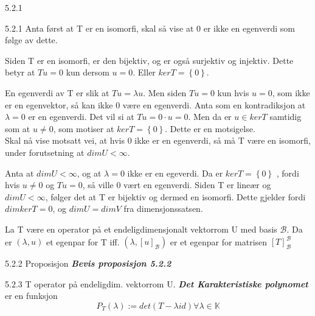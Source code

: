 \documentclass[a4paper,norsk]{article}
\begin{document}
\begin{oppgavebox}{5.2.1}{}

\begin{proofbox}{5.2.1}{}
Anta først at T er en isomorfi, skal så vise at 0 er ikke en egenverdi som følge av dette.

Siden T er en isomorfi, er den bijektiv, og er også surjektiv og injektiv. Dette betyr at $ Tu = 0 $ kun dersom $ u=0$. Eller $ ker T = \left\{ 0 \right\}  $.

En egenverdi av T er slik at $ Tu = \lambda u $. Men siden $ Tu = 0 $ kun hvis $ u=0 $, som ikke er en egenvektor, så kan ikke 0 være en egenverdi. Anta som en kontradiksjon at $ \lambda = 0 $ er en egenverdi. Det vil si at $ Tu = 0  \cdot u=0$. Men da er $ u \in kerT $ samtidig som at $ u\neq 0 $, som motiser at $ kerT = \left\{ 0 \right\}  $. Dette er en motsigelse.\\




Skal nå vise motsatt vei, at hvis 0 ikke er en egenverdi, så må T være en isomorfi, under forutsetning at $ dimU < \infty $.

Anta at $ dimU < \infty $, og at $ \lambda = 0 $ ikke er en egeverdi. Da er $ kerT = \left\{ 0 \right\}  $ , fordi hvis $ u\neq 0 $ og $ Tu=0 $, så ville 0 vært en egenverdi. Siden T er lineær og $ dimU < \infty $, følger det at T er bijektiv og dermed en isomorfi. Dette gjelder fordi $ dim kerT = 0 $, og $ dimU = dimV $ fra dimensjonssatsen.   
\end{proofbox}
\end{oppgavebox}

\begin{propositionbox}{}
    La T være en operator på et endeligdimensjonalt vektorrom U med basis $ \mathcal{B} $. Da er $ \left( \lambda , u \right)  $  et egenpar for T iff. $ \left( \lambda , \left[ u \right]_{ \mathcal{B}}  \right)  $ er et egenpar for matrisen $ \left[ T \right] _{ \mathcal{B}}^{ \mathcal{B}} $
\end{propositionbox}

\begin{oppgavebox}{5.2.2 Proposisjon}{}
\textbf{\textit{Bevis proposisjon 5.2.2}}
\end{oppgavebox}

\begin{definitionbox}{5.2.3}{}
    T operator på endeligdim. vektorrom U. \textbf{\textit{Det Karakteristiske polynomet}} er en funksjon 
    \[
        P_T ( \lambda ) := det \left( T - \lambda id \right) \forall \lambda \in \mathbb{K}
    \]
\end{definitionbox}
\end{document}
